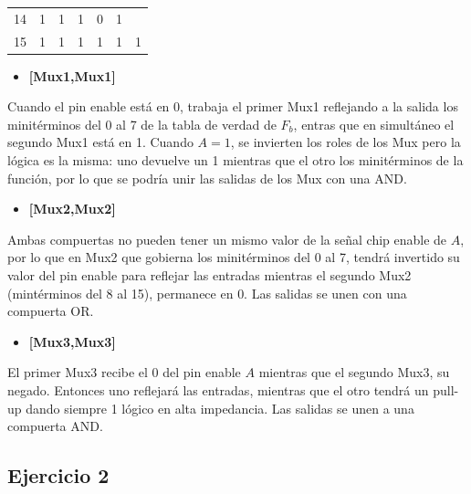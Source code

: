 \begin{center}
\begin{tabular}{ccccccc}
\multicolumn{1}{c|}{14}                          & 1                         & 1                         & 1                         & \multicolumn{1}{c|}{0}                         & \multicolumn{1}{c|}{1}                             &                                  \\
\multicolumn{1}{c|}{15}                          & 1                         & 1                         & 1                         & \multicolumn{1}{c|}{1}                         & \multicolumn{1}{c|}{1}                             & \multirow{-2}{*}{1}
\end{tabular}\end{center}
\begin{itemize}[nosep]\item\textbf{[Mux1,Mux1]}\end{itemize}
\sangria{} Cuando el pin enable está en 0, trabaja el primer Mux1 reflejando a la salida los minitérminos del 0 al 7 de la tabla de verdad de $F_b$, entras que en simultáneo el segundo Mux1 está en 1. Cuando $A=1$, se invierten los roles de los Mux pero la lógica es la misma: uno devuelve un 1 mientras que el otro los minitérminos de la función, por lo que se podría unir las salidas de los Mux con una AND.
\begin{itemize}[nosep]\item\textbf{[Mux2,Mux2]}\end{itemize}
\sangria{} Ambas compuertas no pueden tener un mismo valor de la señal chip enable de $A$, por lo que en Mux2 que gobierna los minitérminos del 0 al 7, tendrá invertido su valor del pin enable para reflejar las entradas mientras el segundo Mux2 (mintérminos del 8 al 15), permanece en 0. Las salidas se unen con una compuerta OR.
\begin{itemize}[nosep]\item\textbf{[Mux3,Mux3]}\end{itemize}
\sangria{} El primer Mux3 recibe el 0 del pin enable $A$ mientras que el segundo Mux3, su negado. Entonces uno reflejará las entradas, mientras que el otro tendrá un pull-up dando siempre 1 lógico en alta impedancia. Las salidas se unen a una compuerta AND.
\newpage
\subsection{Ejercicio 2}
